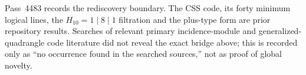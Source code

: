 Pass~4483 records the rediscovery boundary.  The CSS code, its forty minimum
logical lines, the $H_{10}=1\mid8\mid1$ filtration and the plus-type form are
prior repository results.  Searches of relevant primary incidence-module and
generalized-quadrangle code literature did not reveal the exact bridge above;
this is recorded only as ``no occurrence found in the searched sources,'' not
as proof of global novelty.
